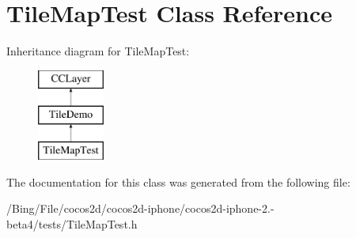 \hypertarget{interface_tile_map_test}{\section{Tile\-Map\-Test Class Reference}
\label{interface_tile_map_test}
}
Inheritance diagram for Tile\-Map\-Test\-:\begin{figure}[H]
\begin{center}
\leavevmode
\includegraphics[height=3.000000cm]{interface_tile_map_test}
\end{center}
\end{figure}


The documentation for this class was generated from the following file\-:\begin{DoxyCompactItemize}
\item 
/\-Bing/\-File/cocos2d/cocos2d-\/iphone/cocos2d-\/iphone-\/2.-\/beta4/tests/Tile\-Map\-Test.\-h\end{DoxyCompactItemize}
